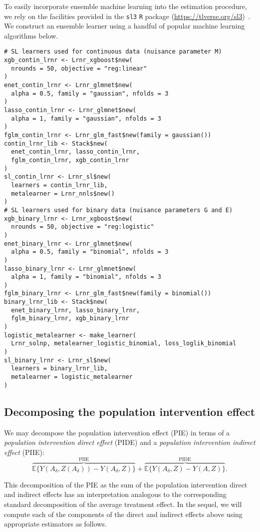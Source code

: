 To easily incorporate ensemble machine learning into the estimation procedure,
we rely on the facilities provided in the \texttt{sl3} \texttt{R}
package (\url{https://tlverse.org/sl3})~\citep{coyle2021sl3}.
We construct an ensemble learner using a handful of popular machine learning
algorithms below.

\begin{lstlisting}
# SL learners used for continuous data (nuisance parameter M)
xgb_contin_lrnr <- Lrnr_xgboost$new(
  nrounds = 50, objective = "reg:linear"
)
enet_contin_lrnr <- Lrnr_glmnet$new(
  alpha = 0.5, family = "gaussian", nfolds = 3
)
lasso_contin_lrnr <- Lrnr_glmnet$new(
  alpha = 1, family = "gaussian", nfolds = 3
)
fglm_contin_lrnr <- Lrnr_glm_fast$new(family = gaussian())
contin_lrnr_lib <- Stack$new(
  enet_contin_lrnr, lasso_contin_lrnr,
  fglm_contin_lrnr, xgb_contin_lrnr
)
sl_contin_lrnr <- Lrnr_sl$new(
  learners = contin_lrnr_lib,
  metalearner = Lrnr_nnls$new()
)
# SL learners used for binary data (nuisance parameters G and E)
xgb_binary_lrnr <- Lrnr_xgboost$new(
  nrounds = 50, objective = "reg:logistic"
)
enet_binary_lrnr <- Lrnr_glmnet$new(
  alpha = 0.5, family = "binomial", nfolds = 3
)
lasso_binary_lrnr <- Lrnr_glmnet$new(
  alpha = 1, family = "binomial", nfolds = 3
)
fglm_binary_lrnr <- Lrnr_glm_fast$new(family = binomial())
binary_lrnr_lib <- Stack$new(
  enet_binary_lrnr, lasso_binary_lrnr,
  fglm_binary_lrnr, xgb_binary_lrnr
)
logistic_metalearner <- make_learner(
  Lrnr_solnp, metalearner_logistic_binomial, loss_loglik_binomial
)
sl_binary_lrnr <- Lrnr_sl$new(
  learners = binary_lrnr_lib,
  metalearner = logistic_metalearner
)
\end{lstlisting}

\subsection{Decomposing the population intervention effect}

We may decompose the population intervention effect (PIE) in terms of a
\textit{population intervention direct effect} (PIDE) and a \textit{population
intervention indirect effect} (PIIE):
\begin{equation*}
  \overbrace{\mathbb{E}\{Y(A_\delta, Z(A_\delta)) -
    Y(A_\delta, Z)\}}^{\text{PIIE}} +
    \overbrace{\mathbb{E}\{Y(A_\delta, Z) - Y(A, Z)\}}^{\text{PIDE}}.
\end{equation*}

This decomposition of the PIE as the sum of the population intervention direct
and indirect effects has an interpretation analogous to the corresponding
standard decomposition of the average treatment effect. In the sequel, we will
compute each of the components of the direct and indirect effects above using
appropriate estimators as follows.

